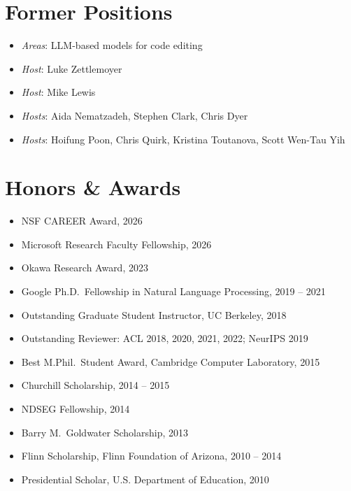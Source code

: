 \section{Former Positions}
\begin{itemize}[leftmargin=-0.4mm,partopsep=0pt,label=]
  \item {}
    \emph{Areas}: LLM-based models for code editing

  \item {}
    \emph{Host}: Luke Zettlemoyer

  \item {}
    \emph{Host}: Mike Lewis

  \item {}
    \emph{Hosts}: Aida Nematzadeh, Stephen Clark, Chris Dyer

  \item {}
    \emph{Hosts}: Hoifung Poon, Chris Quirk, Kristina Toutanova, Scott Wen-Tau Yih
\end{itemize}
\vspace{-0.5em}

\section{Honors \& Awards}
\begin{itemize}[leftmargin=-0.4mm,partopsep=0pt,label=]
  \item NSF CAREER Award, 2026
  \item Microsoft Research Faculty Fellowship, 2026
  \item Okawa Research Award, 2023
  \item Google Ph.D.\ Fellowship in Natural Language Processing, 2019 -- 2021
  \item Outstanding Graduate Student Instructor, UC Berkeley, 2018
  \item Outstanding Reviewer: ACL 2018, 2020, 2021, 2022; NeurIPS 2019
  \item Best M.Phil.\ Student Award, Cambridge Computer Laboratory, 2015
  \item Churchill Scholarship, 2014 -- 2015
  \item NDSEG Fellowship, 2014
  \item Barry M.\ Goldwater Scholarship, 2013
  \item Flinn Scholarship, Flinn Foundation of Arizona, 2010 -- 2014
  \item Presidential Scholar, U.S. Department of Education, 2010
\end{itemize}
\vspace{-0.5em}

